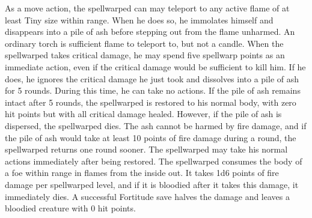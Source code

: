  As a move action, the spellwarped can may teleport to any active flame of at least Tiny size within \rngmed range. When he does so, he immolates himself and disappears into a pile of ash before stepping out from the flame unharmed. An ordinary torch is sufficient flame to teleport to, but not a candle.
 When the spellwarped takes critical damage, he may spend five spellwarp points as an immediate action, even if the critical damage would be sufficient to kill him. If he does, he ignores the critical damage he just took and dissolves into a pile of ash for 5 rounds. During this time, he can take no actions. If the pile of ash remains intact after 5 rounds, the spellwarped is restored to his normal body, with zero hit points but with all critical damage healed. However, if the pile of ash is dispersed, the spellwarped dies. The ash cannot be harmed by fire damage, and if the pile of ash would take at least 10 points of fire damage during a round, the spellwarped returns one round sooner. The spellwarped may take his normal actions immediately after being restored.
 The spellwarped consumes the body of a foe within \rngclose range in flames from the inside out. It takes 1d6 points of fire damage per spellwarped level, and if it is bloodied after it takes this damage, it immediately dies. A successful Fortitude save halves the damage and leaves a bloodied creature with 0 hit points.

